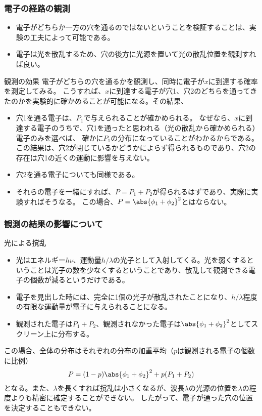 \documentclass[10pt,aspectratio=169,xcolor=dvipsnames,table,dvipdfmx]{beamer}
\begin{document}
\begin{frame}
  \frametitle{電子の経路の観測}
  \begin{itemize}
    \item 電子がどちらか一方の穴を通るのではないということを検証することは、実験の工夫によって可能である。
    \item 電子は光を散乱するため、穴の後方に光源を置いて光の散乱位置を観測すれば良い。
  \end{itemize}
  \begin{block}{観測の効果}
    電子がどちらの穴を通るかを観測し、同時に電子が$x$に到達する確率を測定してみる。
    こうすれば、$x$に到達する電子が穴1、穴2のどちらを通ってきたのかを実験的に確かめることが可能になる。その結果、
    \begin{itemize}
      \item 穴1を通る電子は、$P_1$で与えられることが確かめられる。
      なぜなら、$x$に到達する電子のうちで、穴1を通ったと思われる（光の散乱から確かめられる）電子のみを選べば、
      確かに$P_1$の分布になっていることがわかるからである。この結果は、穴2が閉じているかどうかによらず得られるものであり、穴2の存在は穴1の近くの運動に影響を与えない。
      \item 穴2を通る電子についても同様である。
      \item それらの電子を一緒にすれば、$P=P_1+P_2$が得られるはずであり、実際に実験すればそうなる。
      この場合、$P = \abs{\phi_1+\phi_2}^2$とはならない。
    \end{itemize}
  \end{block}
\end{frame}

\begin{frame}
  \frametitle{観測の結果の影響について}
  \begin{block}{光による撹乱}
    \begin{itemize}
      \item 光はエネルギー$h\nu$、運動量$h/\lambda$の光子として入射してくる。光を弱くするということは光子の数を少なくするということであり、散乱して観測できる電子の個数が減るというだけである。
      \item 電子を見出した時には、完全に1個の光子が散乱されたことになり、$h/\lambda$程度の有限な運動量が電子に与えられることになる。
      \item 観測された電子は$P_1+P_2$、観測されなかった電子は$\abs{\phi_1+\phi_2}^2$としてスクリーン上に分布する。
    \end{itemize}
    この場合、全体の分布はそれぞれの分布の加重平均（$p$は観測される電子の個数に比例）
    \begin{equation}
      P = (1-p)\abs{\phi_1+\phi_2}^2 + p(P_1+P_2)
    \end{equation}
    となる。また、$\lambda$を長くすれば撹乱は小さくなるが、波長$\lambda$の光源の位置を$\lambda$の程度よりも精密に確定することができない。
    したがって、電子が通った穴の位置を決定することもできない。
  \end{block}
\end{frame}
\end{document}
